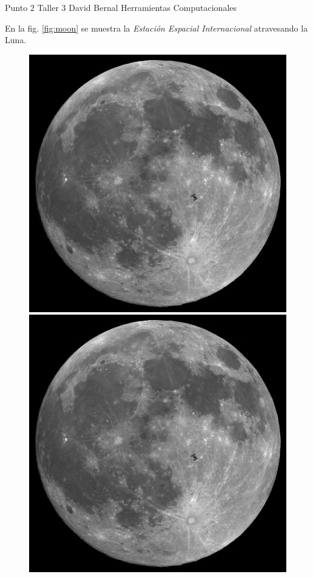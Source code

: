 \documentclass[sts]{article}
\begin{document}
Punto 2 Taller 3 David Bernal Herramientas Computacionales

En la fig. \ref{fig:moon} se muestra la \textit{Estaci\'on Espacial Internacional} atravesando la Luna.

\begin{figure}[h]
\centering
\includegraphics[scale=0.2]{ISS_moon.jpg}
\includegraphics[scale=0.1]{ISS_moon.jpg}

\end{figure}
\end{document}
